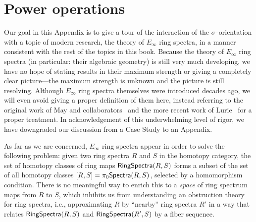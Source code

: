 


\chapter{Power operations}

Our goal in this Appendix is to give a tour of the interaction of the $\sigma$--orientation with a topic of modern research, the theory of $E_\infty$ ring spectra, in a manner consistent with the rest of the topics in this book.  Because the theory of $E_\infty$ ring spectra (in particular: their algebraic geometry) is still very much developing, we have no hope of stating results in their maximum strength or giving a completely clear picture---the maximum strength is unknown and the picture is still resolving.  Although $E_\infty$ ring spectra themselves were introduced decades ago, we will even avoid giving a proper definition of them here, instead referring to the original work of May and collaborators~\cite{EKMM} and the more recent work of Lurie~\cite[Chapter 7]{LurieHA} for a proper treatment.  In acknowledgement of this underwhelming level of rigor, we have downgraded our discussion from a Case Study to an Appendix.

As far as we are concerned, $E_\infty$ ring spectra appear in order to solve the following problem: given two ring spectra $R$ and $S$ in the homotopy category, the set of homotopy classes of ring maps $\mathsf{RingSpectra}(R, S)$ forms a subset of the set of all homotopy classes $[R, S] = \pi_0 \mathsf{Spectra}(R, S)$, selected by a homomorphism condition.  There is no meaningful way to enrich this to a \emph{space} of ring spectrum maps from $R$ to $S$, which inhibits us from understanding an obstruction theory for ring spectra, i.e., approximating $R$ by ``nearby'' ring spectra $R'$ in a way that relates $\mathsf{RingSpectra}(R, S)$ and $\mathsf{RingSpectra}(R', S)$ by a fiber sequence.

